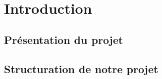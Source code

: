 \section{Introduction}

\subsection{Présentation du projet}


\subsection{Structuration de notre projet}

